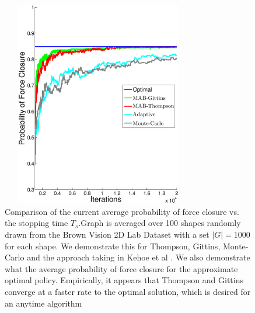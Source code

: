 \documentclass[journal,transmag]{IEEEtran}%
\begin{document}
\begin{figure}[ht!]
\centering
\includegraphics[width = 8.5cm, height = 9cm]{matlab_figures/pfc.eps}
\caption{ \footnotesize Comparison of the current average probability of force closure vs. the stopping time $T_s$.Graph is averaged over 100 shapes randomly drawn from the Brown Vision 2D Lab Dataset \cite{brown} with a set $|G|=1000$ for each shape.  We demonstrate this for Thompson, Gittins, Monte-Carlo and the approach taking in Kehoe et al \cite{kehoe2012toward}. We also demonstrate what the average probability of force closure for the approximate optimal policy. Empirically, it appears that Thompson and Gittins converge at a faster rate to the optimal solution, which is desired for an anytime algorithm  }
\vspace*{-10pt}
\label{fig:grasp_quality}
\end{figure}
\end{document}
